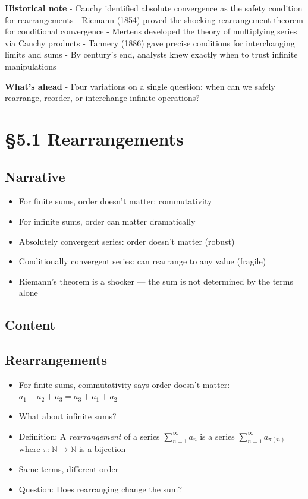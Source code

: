 \documentclass[
  10pt,
  letterpaper,
]{scrbook}
\providecommand{\tightlist}{%
  \setlength{\itemsep}{0pt}\setlength{\parskip}{0pt}}
\begin{document}
\textbf{Historical note} - Cauchy identified absolute convergence as the
safety condition for rearrangements - Riemann (1854) proved the shocking
rearrangement theorem for conditional convergence - Mertens developed
the theory of multiplying series via Cauchy products - Tannery (1886)
gave precise conditions for interchanging limits and sums - By century's
end, analysts knew exactly when to trust infinite manipulations

\textbf{What's ahead} - Four variations on a single question: when can
we safely rearrange, reorder, or interchange infinite operations?

\section{§5.1 Rearrangements}\label{rearrangements}

\subsection{Narrative}\label{narrative-20}

\begin{itemize}
\tightlist
\item
  For finite sums, order doesn't matter: commutativity
\item
  For infinite sums, order can matter dramatically
\item
  Absolutely convergent series: order doesn't matter (robust)
\item
  Conditionally convergent series: can rearrange to any value (fragile)
\item
  Riemann's theorem is a shocker --- the sum is not determined by the
  terms alone
\end{itemize}

\subsection{Content}\label{content-20}

\subsection{Rearrangements}\label{rearrangements-1}

\begin{itemize}
\tightlist
\item
  For finite sums, commutativity says order doesn't matter:
  \(a_1 + a_2 + a_3 = a_3 + a_1 + a_2\)
\item
  What about infinite sums?
\item
  Definition: A \emph{rearrangement} of a series
  \(\sum_{n=1}^{\infty} a_n\) is a series
  \(\sum_{n=1}^{\infty} a_{\pi(n)}\) where
  \(\pi: \mathbb{N} \to \mathbb{N}\) is a bijection
\item
  Same terms, different order
\item
  Question: Does rearranging change the sum?
\end{itemize}
\end{document}

